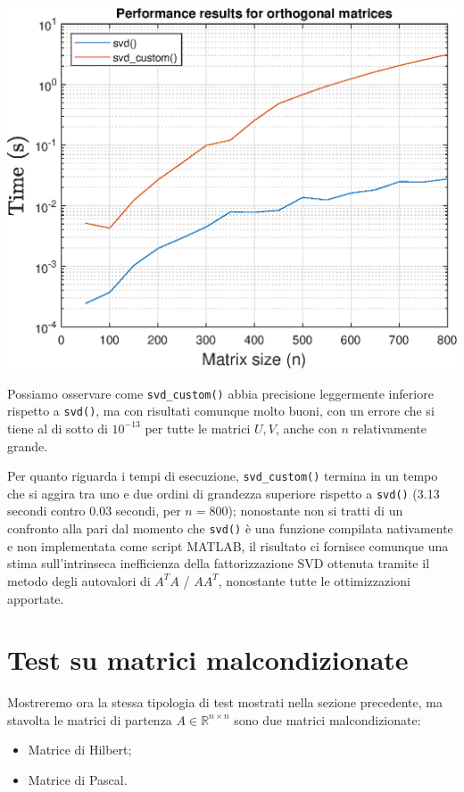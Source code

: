 \includegraphics[scale=.9]{imgs/03_-_Performance_results_for_orthogonal_matrices.eps}
\newpage

\raggedright %
Possiamo osservare come \texttt{svd\_custom()} abbia precisione leggermente 
inferiore rispetto a \texttt{svd()}, ma con risultati comunque molto buoni, con 
un errore che si tiene al di sotto di $10^{-13}$ per tutte le matrici $U,V$, 
anche con $n$ relativamente grande.

Per quanto riguarda i tempi di esecuzione, \texttt{svd\_custom()} termina in un 
tempo che si aggira tra uno e due ordini di grandezza superiore rispetto a 
\texttt{svd()} (3.13 secondi contro 0.03 secondi, per $n = 800$); nonostante non 
si tratti di un confronto alla pari dal momento che \texttt{svd()} è una 
funzione compilata nativamente e non implementata come script MATLAB, il 
risultato ci fornisce comunque una stima sull'intrinseca inefficienza della 
fattorizzazione SVD ottenuta tramite il metodo degli autovalori di
$A^T A$ / $A A^T$, nonostante tutte le ottimizzazioni apportate.


\newpage
\section{Test su matrici malcondizionate}
Mostreremo ora la stessa tipologia di test mostrati nella sezione precedente, ma 
stavolta le matrici di partenza $A \in \mathbb{R}^{n \times n}$ sono due matrici 
malcondizionate:
\begin{itemize}
	\item Matrice di Hilbert;
	\item Matrice di Pascal.
\end{itemize}

